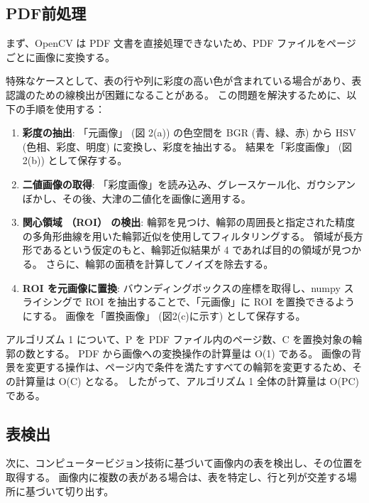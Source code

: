 \documentclass[uplatex, twocolumn,10pt]{jsarticle}
\begin{document}
\subsection{PDF前処理}
まず、OpenCV は PDF 文書を直接処理できないため、PDF ファイルをページごとに画像に変換する。

特殊なケースとして、表の行や列に彩度の高い色が含まれている場合があり、表認識のための線検出が困難になることがある。
この問題を解決するために、以下の手順を使用する：

\begin{enumerate}
    \item \textbf{彩度の抽出}:
    「元画像」 (図 2(a)) の色空間を BGR (青、緑、赤) から HSV (色相、彩度、明度) に変換し、彩度を抽出する。
    結果を「彩度画像」 (図2(b)) として保存する。
    \item \textbf{二値画像の取得}:
    「彩度画像」を読み込み、グレースケール化、ガウシアンぼかし、その後、大津の二値化を画像に適用する。
    \item \textbf{関心領域 （ROI） の検出}:
    輪郭を見つけ、輪郭の周囲長と指定された精度の多角形曲線を用いた輪郭近似を使用してフィルタリングする。
    領域が長方形であるという仮定のもと、輪郭近似結果が 4 であれば目的の領域が見つかる。
    さらに、輪郭の面積を計算してノイズを除去する。
    \item \textbf{ROI を元画像に置換}:
    バウンディングボックスの座標を取得し、numpy スライシングで ROI を抽出することで、「元画像」に ROI を置換できるようにする。
    画像を「置換画像」 (図2(c)に示す) として保存する。
\end{enumerate}


アルゴリズム 1 について、P を PDF ファイル内のページ数、C を置換対象の輪郭の数とする。
PDF から画像への変換操作の計算量は O(1) である。
画像の背景を変更する操作は、ページ内で条件を満たすすべての輪郭を変更するため、その計算量は O(C) となる。
したがって、アルゴリズム 1 全体の計算量は O(PC) である。

\subsection{表検出}
次に、コンピュータービジョン技術に基づいて画像内の表を検出し、その位置を取得する。
画像内に複数の表がある場合は、表を特定し、行と列が交差する場所に基づいて切り出す。
\end{document}
